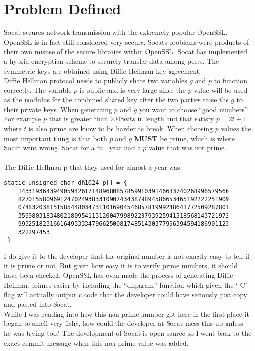 \documentclass[letterpaper,11pt,notitlepage,fleqn]{article}
\begin{document}
\section{Problem Defined}
\indent Socat secures network transmission with the extremely popular OpenSSL. OpenSSL is in fact still considered very secure, Socats problems were products of their own misuse of the secure libraries within OpenSSL. Socat has implemented a hybrid encryption scheme to securely transfer data among peers. The symmetric keys are obtained using Diffie Hellman key agreement.
\\
\indent Diffie Hellman protocol needs to publicly share two variables $g$ and $p$ to function correctly. The variable $p$ is public and is very large since the $p$ value will be used as the modulus for the combined shared key after the two parties raise the $g$ to their private keys. When generating $p$ and $g$ you want to choose “good numbers”. For example $p$ that is greater than $2048bits$ in length and that satisfy $p = 2t+1$ where $t$ is also prime are know to be harder to break.  When choosing $p$ values the most important thing is that both $p$ and $g$ \textbf{MUST} be prime, which is where Socat went wrong. Socat for a full year had a $p$ value that was not prime.
\\
\\
The Diffie Hellman p that they used for almost a year was:
\begin{lstlisting}
static unsigned char dh1024_p[] = {
	143319364394905942617148968085785991039146683740268996579566
	827015580969124702493833109074343879894586653465192222251909
	074832038151585448034731101690454685781999248641772509287801
	359980318348021809541131200479989220793925941518568143721972
	993251823166164933334796625008174851430377966394594186901123
	322297453
 }
\end{lstlisting}
\indent I do give it to the developer that the original number is not exactly easy to tell if it is prime or not, But given how easy it is to verify prime numbers, it should have been checked. OpenSSL has even made the process of generating Diffie Hellman primes easier by including the “dhparam” function which given the ‘-C’ flag will actually output c code that the developer could have seriously just copy and pasted into Socat.
\\
\indent While I was reading into how this non-prime number got here in the first place it began to smell very fishy, how could the developer at Socat mess this up unless he was trying too? The development of Socat is open source so I went back to the exact commit message when this non-prime value was added.
\end{document}
